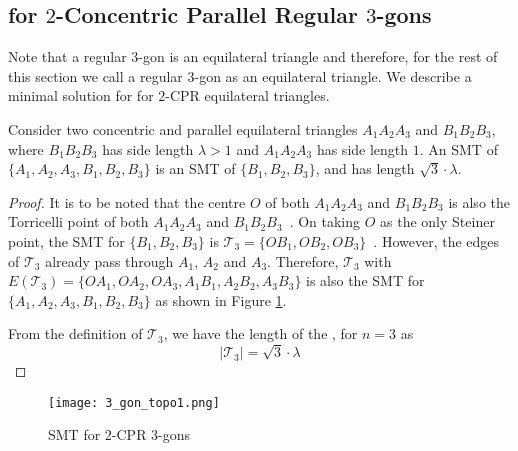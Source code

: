 
\subsection{\ESMT for $2$-Concentric Parallel Regular $3$-gons} \label{triangles}

Note that a regular $3$-gon is an equilateral triangle and therefore, for the rest of this section we call a regular $3$-gon as an equilateral triangle. We describe a minimal solution for \ESMT for $2$-CPR equilateral triangles.

\begin{lemma}\label{3-gon}
Consider two concentric and parallel equilateral triangles $A_1A_2A_3$ and $B_1B_2B_3$, where $B_1B_2B_3$ has side length $\lambda > 1$ and $A_1A_2A_3$ has side length $1$. An SMT of $\{A_1, A_2, A_3, B_1, B_2, B_3\}$ is an SMT of $\{B_1,B_2,B_3\}$, and has length $\sqrt 3 \cdot \lambda$. 
\end{lemma}

\begin{proof}
It is to be noted that the centre $O$ of both $A_1A_2A_3$ and $B_1B_2B_3$ is also the Torricelli point of both $A_1A_2A_3$ and $B_1B_2B_3$~\cite{du1987steiner}. On taking $O$ as the only Steiner point, the SMT for $\{B_1,B_2,B_3\}$ is $ \mathcal T_3 = \{OB_1, OB_2, OB_3\}$~\cite{du1987steiner}. However, the edges of $\mathcal T_3$ already pass through $A_1$, $A_2$ and $A_3$. Therefore, $ \mathcal T_3$ with $E(\mathcal T_3) = \{OA_1, OA_2, OA_3, A_1B_1, A_2B_2, A_3B_3\}$ is also the SMT for $\{A_1, A_2, A_3, B_1, B_2, B_3\}$ as shown in Figure \ref{conc_eq_tri}.

 From the definition of $\mathcal T_3$, we have the length of the \smtpoly, for $n = 3$ as 
$$ | \mathcal T_3 | = \sqrt 3 \cdot \lambda $$ 
\end{proof}

\begin{figure}[h]
\centering
\texttt{[image: 3\_gon\_topo1.png]}
\caption{SMT for $2$-CPR $3$-gons }
\label{conc_eq_tri}
\end{figure}

